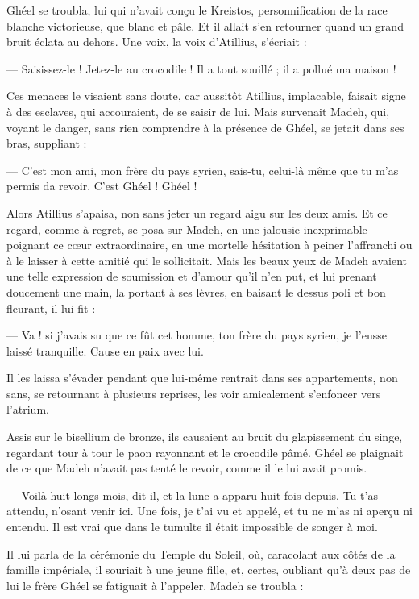 \documentclass[a4paper, 11pt, oneside, polutonikogreek, french]{article}
\begin{document}
Ghéel se troubla, lui qui n'avait conçu le Kreistos, personnification de la race blanche victorieuse, que blanc et pâle. Et il allait s'en retourner quand un grand bruit éclata au dehors. Une voix, la voix d'Atillius, s'écriait :

--- Saisissez-le ! Jetez-le au crocodile ! Il a tout souillé ; il a pollué ma maison !

Ces menaces le visaient sans doute, car aussitôt Atillius, implacable, faisait signe à des esclaves, qui accouraient, de se saisir de lui. Mais survenait Madeh, qui, voyant le danger, sans rien comprendre à la présence de Ghéel, se jetait dans ses bras, suppliant :

--- C'est mon ami, mon frère du pays syrien, sais-tu, celui-là même que tu m'as permis da revoir. C'est Ghéel ! Ghéel !

Alors Atillius s'apaisa, non sans jeter un regard aigu sur les deux amis. Et ce regard, comme à regret, se posa sur Madeh, en une jalousie inexprimable poignant ce cœur extraordinaire, en une mortelle hésitation à peiner l'affranchi ou à le laisser à cette amitié qui le sollicitait. Mais les beaux yeux de Madeh avaient une telle expression de soumission et d'amour qu'il n'en put, et lui prenant doucement une main, la portant à ses lèvres, en baisant le dessus poli et bon fleurant, il lui fit :

--- Va ! si j'avais su que ce fût cet homme, ton frère du pays syrien, je l'eusse laissé tranquille. Cause en paix avec lui.

Il les laissa s'évader pendant que lui-même rentrait dans ses appartements, non sans, se retournant à plusieurs reprises, les voir amicalement s'enfoncer vers l'atrium.

Assis sur le bisellium de bronze, ils causaient au bruit du glapissement du singe, regardant tour à tour le paon rayonnant et le crocodile pâmé. Ghéel se plaignait de ce que Madeh n'avait pas tenté le revoir, comme il le lui avait promis.

--- Voilà huit longs mois, dit-il, et la lune a apparu huit fois depuis. Tu t’as attendu, n'osant venir ici. Une fois, je t'ai vu et appelé, et tu ne m'as ni aperçu ni entendu. Il est vrai que dans le tumulte il était impossible de songer à moi.

Il lui parla de la cérémonie du Temple du Soleil, où, caracolant aux côtés de la famille impériale, il souriait à une jeune fille, et, certes, oubliant qu'à deux pas de lui le frère Ghéel se fatiguait à l'appeler. Madeh se troubla :
\end{document}
